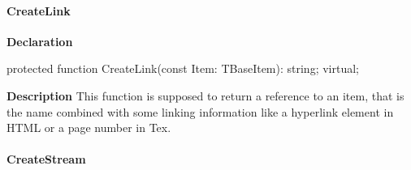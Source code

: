 \documentclass{report}
\newif\ifpdf
\begin{document}
\paragraph*{CreateLink}\hspace*{\fill}

\label{PasDoc_Gen.TDocGenerator-CreateLink}
\begin{list}{}{
\setlength{\itemindent}{0cm}
\setlength{\listparindent}{0cm}
\setlength{\leftmargin}{\evensidemargin}
\addtolength{\leftmargin}{\tmplength}
\settowidth{\labelsep}{X}
\addtolength{\leftmargin}{\labelsep}
\setlength{\labelwidth}{\tmplength}
}
\item[\textbf{Declaration}\hfill]
\ifpdf
\begin{flushleft}
\fi
\begin{ttfamily}
protected function CreateLink(const Item: TBaseItem): string; virtual;\end{ttfamily}

\ifpdf
\end{flushleft}
\fi

\par
\item[\textbf{Description}]
This function is supposed to return a reference to an item, that is the name combined with some linking information like a hyperlink element in HTML or a page number in Tex.

\end{list}
\paragraph*{CreateStream}\hspace*{\fill}
\end{document}
